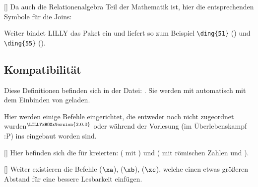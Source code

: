 %
%
%

[\cmdlist {}\cmdlist {}\cmdlist {}]
Da auch die Relationenalgebra Teil der Mathematik ist, hier die entsprechenden Symbole für die Joins:
%
%
%
\begin{bemerkung}
    Weiter bindet LILLY das  Paket ein und liefert so zum Beispiel \verb|\ding{51}| () und \verb|\ding{55}| ().
\end{bemerkung}









\subsection[Kompatibilität \LILLYxBOXxVersion{\small 1.0.3}]{Kompatibilität}
Diese Definitionen befinden sich in der Datei: . Sie werden mit  automatisch mit dem Einbinden von  geladen.\medskip

Hier werden einige Befehle eingerichtet, die entweder noch nicht zugeordnet wurden\({}^{\tiny \LILLYxBOXxVersion{\tiny 2.0.0}}\) oder während der Vorlesung (im Überlebenskampf :P) ins  eingebaut worden sind.

%
%
%

[\cmdlist {}]
Hier befinden sich die für \la kreierten:  ( mit \newline{}) und  ( mit römischen Zahlen und \newline{}).

%
%
%

[\cmdlist {}\cmdlist {}]
Weiter existieren die Befehle  ($\xa$),  ($\xb$),  ($\xc$), welche einen etwas größeren Abstand für eine bessere Lesbarkeit einfügen.

%
%
%


